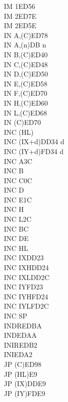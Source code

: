 \begin{multicols}{3}
{\begin{tabbing}
        IM 1\>ED56\\
        IM 2\UNDOC\>ED7E\\
        IM 2\>ED5E\\
        IN A,(C)\>ED78\\
        IN A,(n)\>DB n\\
        IN B,(C)\>ED40\\
        IN C,(C)\>ED48\\
        IN D,(C)\>ED50\\
        IN E,(C)\>ED58\\
        IN F,(C)\UNDOC\>ED70\\
        IN H,(C)\>ED60\\
        IN L,(C)\>ED68\\
        IN (C)\UNDOC\>ED70\\
        INC (HL)\\
        INC (IX+d)\>DD34 d\\
        INC (IY+d)\>FD34 d\\
        INC A\>3C\\
        INC B\\
        INC C\>0C\\
        INC D\\
        INC E\>1C\\
        INC H\\
        INC L\>2C\\
        INC BC\\
        INC DE\\
        INC HL\\
        INC IX\>DD23\\
        INC IXH\UNDOC\>DD24\\
        INC IXL\UNDOC\>DD2C\\
        INC IY\>FD23\\
        INC IYH\UNDOC\>FD24\\
        INC IYL\UNDOC\>FD2C\\
        INC SP\\
        INDR\>EDBA\\
        IND\>EDAA\\
        INIR\>EDB2\\
        INI\>EDA2\\
        JP (C)\ZXN\>ED98\\
        JP (HL)\>E9\\
        JP (IX)\>DDE9\\
        JP (IY)\>FDE9\\

\end{tabbing}}
\end{multicols}
